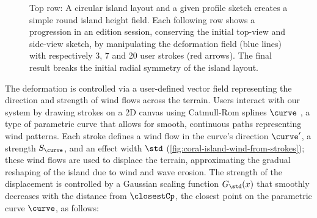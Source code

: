 \begin{figure} 
    \caption{Top row: A circular island layout and a given profile sketch creates a simple round island height field. Each following row shows a progression in an edition session, conserving the initial top-view and side-view sketch, by manipulating the deformation field (blue lines) with respectively 3, 7 and 20 user strokes (red arrows). The final result breaks the initial radial symmetry of the island layout. }
    \label{fig:coral-island-wind-stroke-edition}
\end{figure}

The deformation is controlled via a user-defined vector field representing the direction and strength of wind flows across the terrain. Users interact with our system by drawing strokes on a 2D canvas using Catmull-Rom splines $\curve$ \cite{Catmull1974}, a type of parametric curve that allows for smooth, continuous paths representing wind patterns. Each stroke defines a wind flow in the curve's direction $\curve'$, a strength $S_\curve$, and an effect width $\std$ (\cref{fig:coral-island-wind-from-strokes}); these wind flows are used to displace the terrain, approximating the gradual reshaping of the island due to wind and wave erosion. The strength of the displacement is controlled by a Gaussian scaling function $G_\std(x)$ that smoothly decreases with the distance from $\closestCp$, the closest point on the parametric curve $\curve$, as follows:

